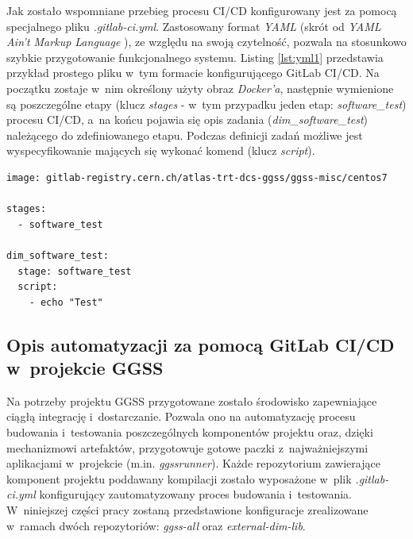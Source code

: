 Jak zostało wspomniane przebieg procesu CI/CD konfigurowany jest za pomocą specjalnego pliku \textit{.gitlab-ci.yml}. Zastosowany format \textit{YAML} (skrót od \textit{YAML Ain't Markup Language} \cite{YAMLWiki}), ze względu na swoją czytelność, pozwala na stosunkowo szybkie przygotowanie funkcjonalnego systemu. Listing \ref{lst:yml1} przedstawia przykład prostego pliku w~tym formacie konfigurującego GitLab CI/CD. Na początku zostaje w~nim określony użyty obraz \textit{Docker'a}, następnie wymienione są poszczególne etapy (klucz \textit{stages} - w~tym przypadku jeden etap: \textit{software\_test}) procesu CI/CD, a~na końcu pojawia się opis zadania (\textit{dim\_software\_test}) należącego do zdefiniowanego etapu. Podczas definicji zadań możliwe jest wyspecyfikowanie mających się wykonać komend (klucz \textit{script}).

\begin{lstlisting}[caption={Przykład prostego pliku \textit{.gitlab-ci.yml} generującego jeden etap procesu CI/CD oraz jedno zadanie w~ramach tego etapu}, label={lst:yml1}]
image: gitlab-registry.cern.ch/atlas-trt-dcs-ggss/ggss-misc/centos7

stages:
  - software_test

dim_software_test:
  stage: software_test
  script:
    - echo "Test"

\end{lstlisting}

\subsection{Opis automatyzacji za pomocą GitLab CI/CD w~projekcie GGSS}
Na potrzeby projektu GGSS przygotowane zostało środowisko zapewniające ciągłą integrację i~dostarczanie. Pozwala ono na automatyzację procesu budowania i~testowania poszczególnych komponentów projektu oraz, dzięki mechanizmowi artefaktów, przygotowuje gotowe paczki z~najważniejszymi aplikacjami w~projekcie (m.in. \textit{ggssrunner}). Każde repozytorium zawierające komponent projektu poddawany kompilacji zostało wyposażone w~plik \textit{.gitlab-ci.yml} konfigurujący zautomatyzowany proces budowania i~testowania. W~niniejszej części pracy zostaną przedstawione konfiguracje zrealizowane w~ramach dwóch repozytoriów: \textit{ggss-all} oraz \textit{external-dim-lib}. 


